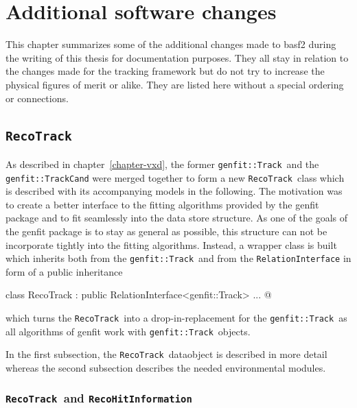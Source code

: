 \newcommand{\RecoTrack}{\texttt{RecoTrack}\ }
\newcommand{\Track}{\texttt{genfit::Track}\ }
\newcommand{\Hit}{\texttt{RecoHitInformation}\ }
\chapter{Additional software changes} \label{chapter-addon}

This chapter summarizes some of the additional changes made to basf2 during the writing of this thesis for documentation purposes. They all stay in relation to the changes made for the tracking framework but do not try to increase the physical figures of merit or alike. They are listed here without a special ordering or connections.

\section{\texttt{RecoTrack}}
As described in chapter~\ref{chapter-vxd}, the former \Track and the \texttt{genfit::TrackCand} were merged together to form a new \RecoTrack class which is described with its accompanying models in the following. The motivation was to create a better interface to the fitting algorithms provided by the genfit package and to fit seamlessly into the data store structure. As one of the goals of the genfit package is to stay as general as possible, this structure can not be incorporate tightly into the fitting algorithms. Instead, a wrapper class is built which inherits both from the \Track and from the \texttt{RelationInterface} in form of a public inheritance 
\begin{center}
  \lstset{escapechar=@,style=customC}
  \lstinline@ class RecoTrack : public RelationInterface<genfit::Track> { ... }@
\end{center}
which turns the \RecoTrack into a drop-in-replacement for the \Track as all algorithms of genfit work with \Track objects. 

In the first subsection, the \RecoTrack dataobject is described in more detail whereas the second subsection describes the needed environmental modules.

\subsection{\RecoTrack and \Hit}

